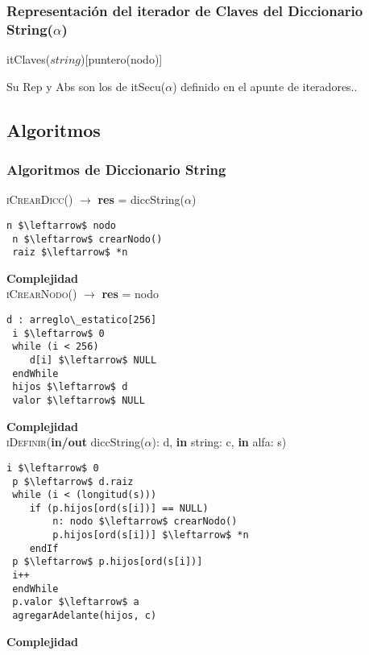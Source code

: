 

  \subsubsection{Representaci\'on del iterador de Claves del Diccionario String($\alpha$)}

    \begin{Estructura}{itClaves($string$)}[puntero(nodo)]
    \end{Estructura}

    Su Rep y Abs son los de itSecu($\alpha$) definido en el apunte de iteradores..

  \subsection{Algoritmos}
\subsubsection{Algoritmos de Diccionario String}

\textsc{iCrearDicc}() $\rightarrow$ \textbf{res} = diccString($\alpha$)
\begin{lstlisting}[mathescape]
 n $\leftarrow$ nodo
 n $\leftarrow$ crearNodo()
 raiz $\leftarrow$ *n
\end{lstlisting}
\textbf{Complejidad}\\

\textsc{iCrearNodo}() $\rightarrow$ \textbf{res} = nodo
\begin{lstlisting}[mathescape]
 d : arreglo\_estatico[256]
 i $\leftarrow$ 0
 while (i < 256)
 	d[i] $\leftarrow$ NULL
 endWhile
 hijos $\leftarrow$ d
 valor $\leftarrow$ NULL
\end{lstlisting}
\textbf{Complejidad}\\

\textsc{iDefinir}(\textbf{in/out} diccString($\alpha$): d, \textbf{in} string: c, \textbf{in} alfa: s)
\begin{lstlisting}[mathescape]
 i $\leftarrow$ 0
 p $\leftarrow$ d.raiz
 while (i < (longitud(s)))
 	if (p.hijos[ord(s[i])] == NULL)
		n: nodo $\leftarrow$ crearNodo()
		p.hijos[ord(s[i])] $\leftarrow$ *n
	endIf
 p $\leftarrow$ p.hijos[ord(s[i])]
 i++
 endWhile
 p.valor $\leftarrow$ a
 agregarAdelante(hijos, c)
\end{lstlisting}
\textbf{Complejidad}\\

